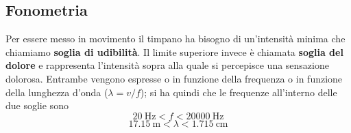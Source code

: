 \documentclass[x11names]{report}
\newcommand{\viola}[1]{\colorbox{yred}{$\displaystyle #1$}}
\begin{document}
%	
%	
	
	\subsection{Fonometria}
	Per essere messo in movimento il timpano ha bisogno di un'intensità minima che chiamiamo \textbf{soglia di udibilità}. Il limite superiore invece è chiamata \textbf{soglia del dolore} e rappresenta l'intensità sopra alla quale si percepisce una sensazione dolorosa. Entrambe vengono espresse o in funzione della frequenza o in funzione della lunghezza d'onda (\(\lambda=v/f\)); si ha quindi che le frequenze all'interno delle due soglie sono
	\[ 
	\SI{20}{\hertz} < f < \SI{20000}{\hertz}
	\]
	\[ 
	\SI{17.15}{\m} < \lambda < \SI{1.715}{\cm}
	\]
	
\end{document}
